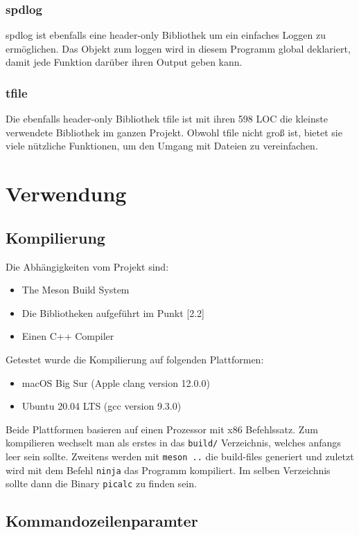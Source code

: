 \documentclass[12pt]{article}
\begin{document}
\subsubsection{spdlog}
spdlog \cite{spdlog} ist ebenfalls eine header-only Bibliothek um ein einfaches 
Loggen zu ermöglichen. Das Objekt zum loggen wird in diesem Programm global 
deklariert, damit jede Funktion darüber ihren Output geben kann.
\subsubsection{tfile}
Die ebenfalls header-only Bibliothek tfile \cite{tfile} ist mit ihren 598 LOC 
die kleinste verwendete Bibliothek im ganzen Projekt. Obwohl tfile nicht groß 
ist, bietet sie viele nützliche Funktionen, um den Umgang mit Dateien zu vereinfachen.
\section{Verwendung}
\subsection{Kompilierung}
Die Abhängigkeiten vom Projekt sind:
\begin{itemize}
    \item The Meson Build System \cite{meson}
    \item Die Bibliotheken aufgeführt im Punkt [2.2]
    \item Einen C++ Compiler
\end{itemize}
Getestet wurde die Kompilierung auf folgenden Plattformen:
\begin{itemize}
    \item macOS Big Sur (Apple clang version 12.0.0)
    \item Ubuntu 20.04 LTS (gcc version 9.3.0)
\end{itemize}
Beide Plattformen basieren auf einen Prozessor mit x86 Befehlssatz.
\newline
\newline
Zum kompilieren wechselt man als erstes in das \texttt{build/} Verzeichnis,
welches anfangs leer sein sollte. Zweitens werden mit \texttt{meson ..} die 
build-files generiert und zuletzt wird mit dem Befehl \texttt{ninja} das 
Programm kompiliert. Im selben Verzeichnis sollte dann die Binary
\texttt{picalc} zu finden sein.
\newpage
\subsection{Kommandozeilenparamter}
\end{document}
